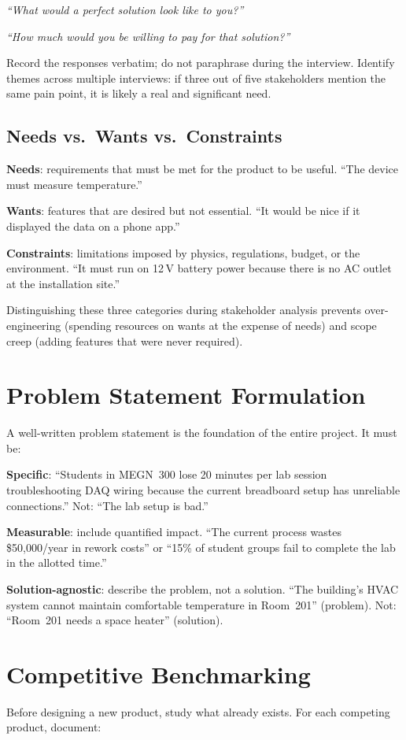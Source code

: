 \emph{``What would a perfect solution look like to you?''}

\emph{``How much would you be willing to pay for that solution?''}

Record the responses verbatim; do not paraphrase during the interview. Identify themes across multiple interviews: if three out of five stakeholders mention the same pain point, it is likely a real and significant need.

\subsection{Needs vs.\ Wants vs.\ Constraints}
\textbf{Needs}: requirements that must be met for the product to be useful. ``The device must measure temperature.''

\textbf{Wants}: features that are desired but not essential. ``It would be nice if it displayed the data on a phone app.''

\textbf{Constraints}: limitations imposed by physics, regulations, budget, or the environment. ``It must run on 12\,V battery power because there is no AC outlet at the installation site.''

Distinguishing these three categories during stakeholder analysis prevents over-engineering (spending resources on wants at the expense of needs) and scope creep (adding features that were never required).

\section{Problem Statement Formulation}
A well-written problem statement is the foundation of the entire project. It must be:

\textbf{Specific}: ``Students in MEGN~300 lose 20 minutes per lab session troubleshooting DAQ wiring because the current breadboard setup has unreliable connections.'' Not: ``The lab setup is bad.''

\textbf{Measurable}: include quantified impact. ``The current process wastes \$50{,}000/year in rework costs'' or ``15\% of student groups fail to complete the lab in the allotted time.''

\textbf{Solution-agnostic}: describe the problem, not a solution. ``The building's HVAC system cannot maintain comfortable temperature in Room~201'' (problem). Not: ``Room~201 needs a space heater'' (solution).

\section{Competitive Benchmarking}
Before designing a new product, study what already exists. For each competing product, document:


